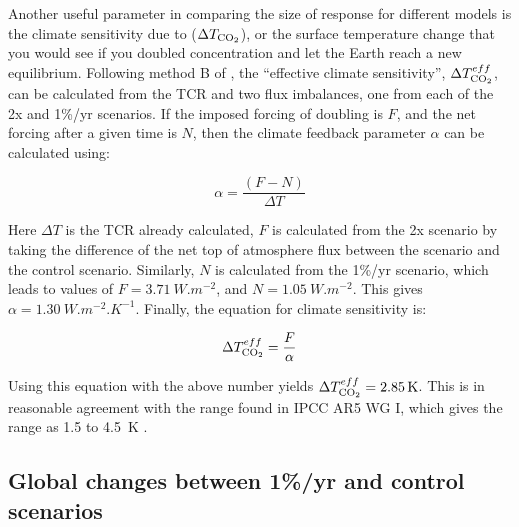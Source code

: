 \documentclass{article}
\begin{document}
Another useful parameter in comparing the size of response for different models is the climate sensitivity due to  ($\Delta T_{\ce{CO2}}$), or the surface temperature change that you would see if you doubled  concentration and let the Earth reach a new equilibrium. Following method B of \textcite{gregory2004new}, the ``effective climate sensitivity'', $\Delta T^{eff}_{\ce{CO2}}$, can be calculated from the TCR and two flux imbalances, one from each of the 2x and 1\%/yr scenarios. If the imposed forcing of doubling  is $F$, and the net forcing after a given time is $N$, then the climate feedback parameter $\alpha$ can be calculated using:

\begin{equation}
    \alpha = \frac{(F - N)}{\Delta T}
    \label{eqn:alpha}
\end{equation}

Here $\Delta T$ is the TCR already calculated, $F$ is calculated from the 2x scenario by taking the difference of the net top of atmosphere flux between the scenario and the control scenario. Similarly, $N$ is calculated from the 1\%/yr scenario, which leads to values of $F = \SI{3.71}{W.m^{-2}}$, and $N = \SI{1.05}{W.m^{-2}}$. This gives $\alpha = \SI{1.30}{W.m^{-2}.K^{-1}}$. Finally, the equation for climate sensitivity is:

\begin{equation}
    \Delta T^{eff}_{\ce{CO2}} = \frac{F}{\alpha}
    \label{eqn:delta_t}
\end{equation}

Using this equation with the above number yields $\Delta T^{eff}_{\ce{CO2}} = \SI{2.85}{K}$. This is in reasonable agreement with the range found in IPCC AR5 WG I, which gives the range as 1.5 to \SI{4.5}{K} \parencite{ipcc2014wg1}.

\subsection{Global changes between 1\%/yr and control scenarios}

\end{document}

